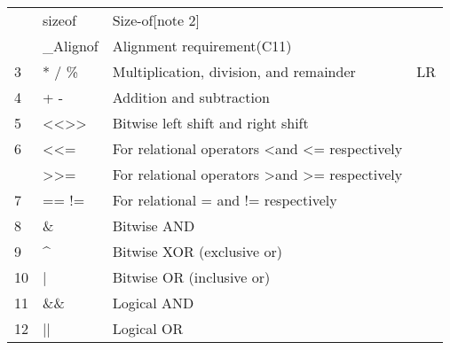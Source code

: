 \documentclass{extarticle}
\begin{document}
\begin{multicols}{2}
\begin{tabular}{|l|l|l|l|}
               & sizeof                                                & Size-of{[}note 2{]}                                                    &               \\
               & \_Alignof                                             & Alignment requirement(C11)                                             &               \\ \hline
3              & * / \%                                                & Multiplication, division, and remainder                                & LR            \\ \hline
4              & + -                                                   & Addition and subtraction                                               &               \\ \hline
5              & \textless{}\textless \textgreater{}\textgreater{}     & Bitwise left shift and right shift                                     &               \\ \hline
6              & \textless \textless{}=                                & For relational operators \textless and \textless{}= respectively       &               \\ \hline
               & \textgreater \textgreater{}=                          & For relational operators \textgreater and \textgreater{}= respectively &               \\ \hline
7              & == !=                                                 & For relational = and != respectively                                   &               \\ \hline
8              & \&                                                    & Bitwise AND                                                            &               \\ \hline
9              & \textasciicircum{}                                    & Bitwise XOR (exclusive or)                                             &               \\ \hline
10             & |                                                     & Bitwise OR (inclusive or)                                              &               \\ \hline
11             & \&\&                                                  & Logical AND                                                            &               \\ \hline
12             & ||                                                    & Logical OR                                                             &               \\ \hline

\end{tabular}
\end{multicols}
\end{document}
